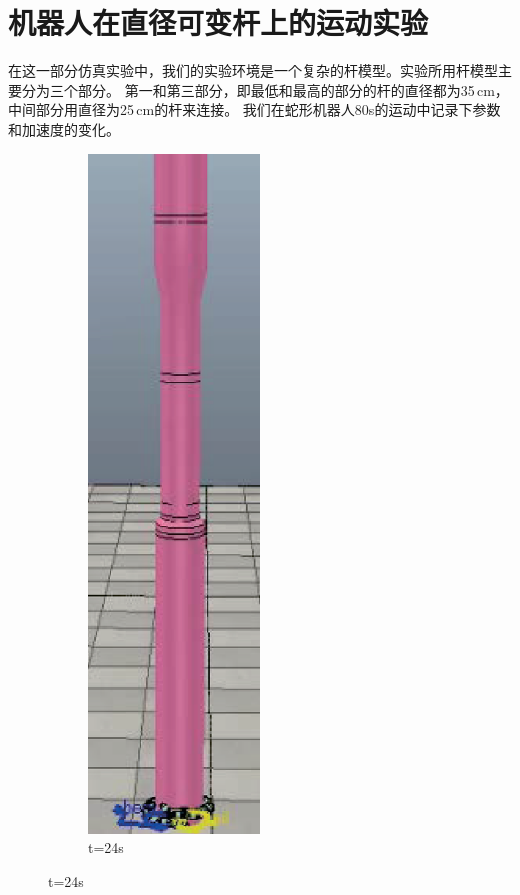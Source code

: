 \section{机器人在直径可变杆上的运动实验}
在这一部分仿真实验中，我们的实验环境是一个复杂的杆模型。实验所用杆模型主要分为三个部分。 第一和第三部分，即最低和最高的部分的杆的直径都为35\,cm，中间部分用直径为25\,cm的杆来连接。 我们在蛇形机器人80s的运动中记录下参数和加速度的变化。
\begin{figure}[htbp]
	\centering
	\begin{subfigure}{0.3\textwidth}{
			\centering
			\includegraphics[height=0.18\textheight,width=0.5\textwidth]{figure/chap05/BSB/34s.eps}
			\caption{t=24s}
		}

\end{subfigure}
\end{figure}

